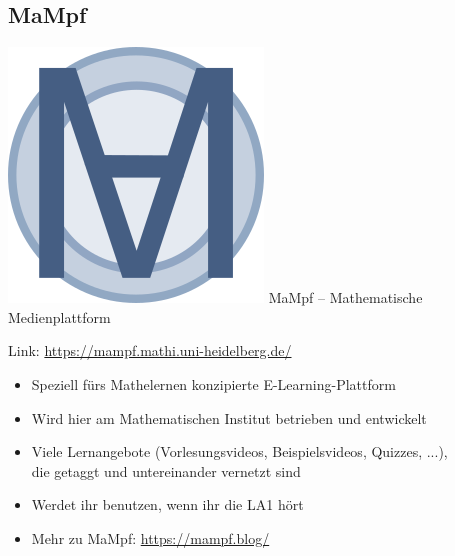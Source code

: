 \subsection{MaMpf}
\begin{frame}{\includegraphics[scale=0.072]{images/mampf.png} MaMpf -- Mathematische Medienplattform}

    Link: \url{https://mampf.mathi.uni-heidelberg.de/}

    \begin{itemize}
        \item Speziell fürs Mathelernen konzipierte E-Learning-Plattform
        \item Wird hier am Mathematischen Institut betrieben und entwickelt
        \item Viele Lernangebote (Vorlesungsvideos, Beispielsvideos, Quizzes, ...),\\
              die getaggt und untereinander vernetzt sind
        \item Werdet ihr benutzen, wenn ihr die LA1 hört
        \item Mehr zu MaMpf: \url{https://mampf.blog/}
    \end{itemize}
    \vspace{-3.7em}
    \begin{flushright}
    \end{flushright}


\end{frame}

